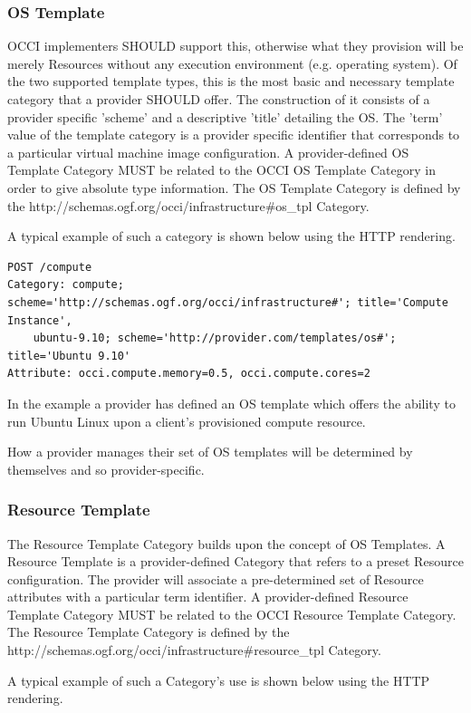 \documentclass[10pt,a4paper]{article}
\begin{document}
\subsubsection{OS Template}
OCCI implementers SHOULD support this, otherwise what they provision will be merely Resources without any execution environment (e.g. operating system). Of the two supported template types, this is the most basic and necessary template category that a provider SHOULD offer. The construction of it consists of a provider specific 'scheme' and a descriptive 'title' detailing the OS. The 'term' value of the template category is a provider specific identifier that corresponds to a particular virtual machine image configuration. A provider-defined OS Template Category MUST be related to the OCCI OS Template Category in order to give absolute type information. The OS Template Category is defined by the http://schemas.ogf.org/occi/infrastructure\#os\_tpl Category.

A typical example of such a category is shown below using the HTTP rendering. 

\begin{verbatim}
POST /compute
Category: compute; scheme='http://schemas.ogf.org/occi/infrastructure#'; title='Compute Instance', 
    ubuntu-9.10; scheme='http://provider.com/templates/os#'; title='Ubuntu 9.10'
Attribute: occi.compute.memory=0.5, occi.compute.cores=2
\end{verbatim}
In the example a provider has defined an OS template which offers the ability to run Ubuntu Linux upon a client's provisioned compute resource.

How a provider manages their set of OS templates will be determined by themselves and so provider-specific.

\subsubsection{Resource Template}
The Resource Template Category builds upon the concept of OS Templates. A Resource Template is a provider-defined Category that refers to a preset Resource configuration. The provider will associate a pre-determined set of Resource attributes with a particular term identifier. A provider-defined Resource Template Category MUST be related to the OCCI Resource Template Category. The Resource Template Category is defined by the http://schemas.ogf.org/occi/infrastructure\#resource\_tpl Category.

A typical example of such a Category's use is shown below using the HTTP rendering. 
\end{document}
